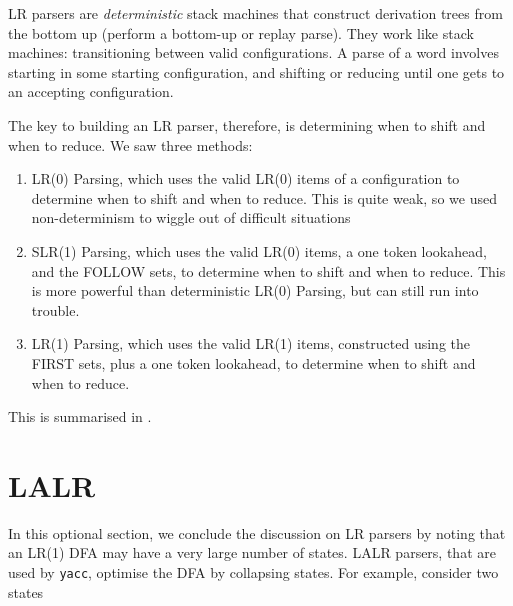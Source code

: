 LR parsers are \textit{deterministic} stack machines that construct derivation trees from the bottom up (perform a bottom-up or replay parse). They work like stack machines: transitioning between valid configurations. A parse of a word involves starting in some starting configuration, and shifting or reducing until one gets to an accepting configuration. 

The key to building an LR parser, therefore, is determining when to shift and when to reduce. We saw three methods:

\begin{enumerate}
    \item LR(0) Parsing, which uses the valid LR(0) items of a configuration to determine when to shift and when to reduce. This is quite weak, so we used non-determinism to wiggle out of difficult situations
    \item SLR(1) Parsing, which uses the valid LR(0) items, a one token lookahead, and the FOLLOW sets, to determine when to shift and when to reduce. This is more powerful than deterministic LR(0) Parsing, but can still run into trouble. 
    \item LR(1) Parsing, which uses the valid LR(1) items, constructed using the FIRST sets, plus a one token lookahead, to determine when to shift and when to reduce.
\end{enumerate}

This is summarised in .

\section{LALR\optional}
In this optional section, we conclude the discussion on LR parsers by noting that an LR(1) DFA may have a very large number of states. LALR parsers, that are used by \texttt{yacc}, optimise the DFA by collapsing states. For example, consider two states

\begin{center}
\end{center}

